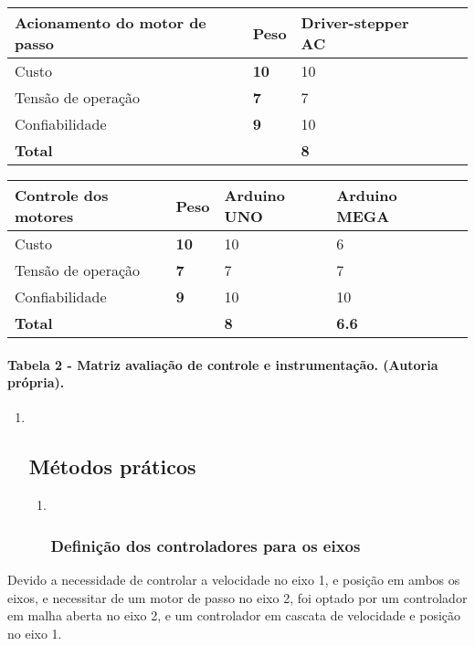\documentclass[]{article}
\let\oldparagraph\paragraph
\renewcommand{\paragraph}[1]{\oldparagraph{#1}\mbox{}}
\begin{document}
\begin{longtable}[]{@{}lllll@{}}
\toprule
\textbf{Acionamento do motor de passo} & \textbf{Peso} &
\textbf{Driver-stepper AC} & &\tabularnewline
\midrule
\endhead
Custo & \textbf{10} & 10 & &\tabularnewline
Tensão de operação & \textbf{7} & 7 & &\tabularnewline
Confiabilidade & \textbf{9} & 10 & &\tabularnewline
\textbf{Total} & & \textbf{8} & &\tabularnewline
\bottomrule
\end{longtable}

\begin{longtable}[]{@{}lllll@{}}
\toprule
\textbf{Controle dos motores} & \textbf{Peso} & \textbf{Arduino UNO} &
\textbf{Arduino MEGA} &\tabularnewline
\midrule
\endhead
Custo & \textbf{10} & 10 & 6 &\tabularnewline
Tensão de operação & \textbf{7} & 7 & 7 &\tabularnewline
Confiabilidade & \textbf{9} & 10 & 10 &\tabularnewline
\textbf{Total} & & \textbf{8} & \textbf{6.6} &\tabularnewline
\bottomrule
\end{longtable}

\paragraph{Tabela 2 - Matriz avaliação de controle e instrumentação.
(Autoria
própria).}\label{tabela-2---matriz-avaliauxe7uxe3o-de-controle-e-instrumentauxe7uxe3o.-autoria-pruxf3pria.}

\begin{enumerate}
\def\labelenumi{\arabic{enumi}.}
\item ~
  \subsection{Métodos práticos}\label{muxe9todos-pruxe1ticos}

  \begin{enumerate}
  \def\labelenumii{\arabic{enumii}.}
  \item ~
    \subsubsection{Definição dos controladores para os
    eixos}\label{definiuxe7uxe3o-dos-controladores-para-os-eixos}
  \end{enumerate}
\end{enumerate}

Devido a necessidade de controlar a velocidade no eixo 1, e posição em
ambos os eixos, e necessitar de um motor de passo no eixo 2, foi optado
por um controlador em malha aberta no eixo 2, e um controlador em
cascata de velocidade e posição no eixo 1.
\end{document}
